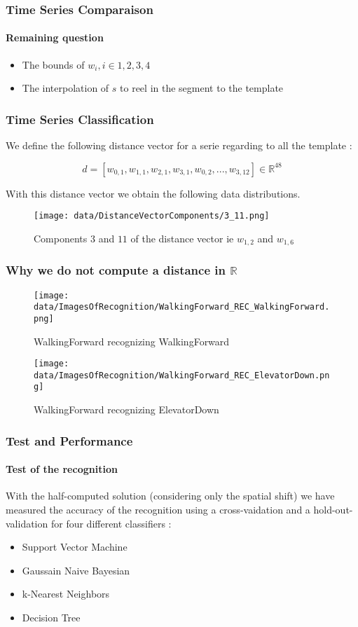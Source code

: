 \documentclass[11pt, sans, handout]{beamer}
\newcommand{\R}{\mathbb{R}}
\begin{document}
\begin{frame}
	\frametitle{Time Series Comparaison}
	\framesubtitle{Remaining question}

	\begin{itemize}
		\item The bounds of $w_i, i \in {1,2,3,4}$
		\item The interpolation of $s$ to reel in the segment to the template
	\end{itemize}		
\end{frame}

\begin{frame}
	\frametitle{Time Series Classification}

	We define the following distance vector for a serie regarding to all the template :
	
	\[ d=[w_{0,1}, w_{1,1}, w_{2,1}, w_{3,1}, w_{0,2}, ..., w_{3,12}] \in \R^{48} \]
	
	With this distance vector we obtain the following data distributions. 
	
	\begin{figure}[H]
		\centering
		\texttt{[image: data/DistanceVectorComponents/3\_11.png]}
		\caption{Components $3$ and $11$ of the distance vector ie $w_{1,2}$ and $w_{1,6}$}
		\label{dist_components}
	\end{figure}
	
\end{frame}

\begin{frame}
	\frametitle{Why we do not compute a distance in $\R$}
	
	\begin{figure}
      \texttt{[image: data/ImagesOfRecognition/WalkingForward\_REC\_WalkingForward.png]}
      \caption{WalkingForward recognizing WalkingForward}
   	\end{figure} 
   	\begin{figure}
      \texttt{[image: data/ImagesOfRecognition/WalkingForward\_REC\_ElevatorDown.png]}
      \caption{WalkingForward recognizing ElevatorDown}
	\end{figure}
	
\end{frame}

\begin{frame}
	\frametitle{Test and Performance}
	\framesubtitle{Test of the recognition}
	
	With the half-computed solution (considering only the spatial shift) we have measured the accuracy of the recognition using a cross-vaidation and a hold-out-validation for four different classifiers :
	
	\begin{itemize}
		\item Support Vector Machine
		\item Gaussain Naive Bayesian
		\item k-Nearest Neighbors
		\item Decision Tree
	\end{itemize}
		
\end{frame}
\end{document}
